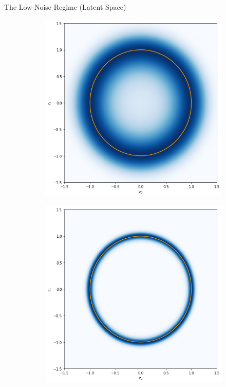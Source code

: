 \documentclass[10pt]{beamer}
\begin{document}
\begin{frame}[fragile]{The Low-Noise Regime (Latent Space)}
    \begin{figure}
        \begin{subfigure}[b]{0.3\textwidth}
            \includegraphics[width=\textwidth]{manifold_high_noise.png}
        \end{subfigure}%
        \begin{subfigure}[b]{0.3\textwidth}
            \includegraphics[width=\textwidth]{manifold_mid_noise.png}

\end{subfigure}
\end{figure}
\end{frame}
\end{document}
